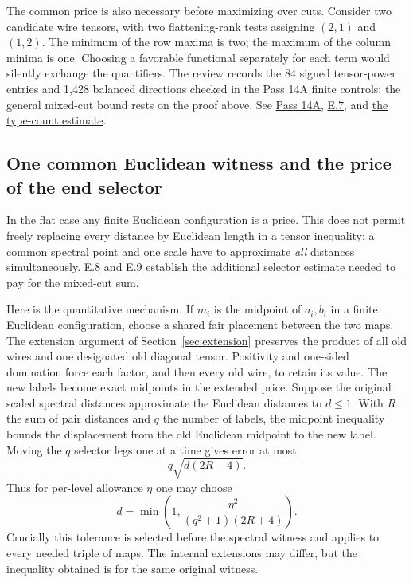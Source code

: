 \documentclass[11pt,letterpaper]{article}
\theoremstyle{definition}\newtheorem{definition}[theorem]{Definition}\newtheorem{example}[theorem]{Example}
\theoremstyle{remark}\newtheorem{remark}[theorem]{Remark}
\newcommand{\pub}[3]{\href{https://github.com/anthropics/formal-math/blob/11b6c7e3c927df2658f513b6b68ea7f8929c62c5/vp-vnp/#1\#L#2}{#3}}
\newcommand{\aud}[2]{\href{https://github.com/nousentllc/VP-VNP-Review/blob/567303d0bcf4f9d54390437b137752446e58ccd6/#1}{#2}}
\begin{document}
The common price is also necessary before maximizing over cuts. Consider two candidate wire tensors, with two flattening-rank tests assigning $(2,1)$ and $(1,2)$. The minimum of the row maxima is two; the maximum of the column minima is one. Choosing a favorable functional separately for each term would silently exchange the quantifiers. The review records the 84 signed tensor-power entries and 1,428 balanced directions checked in the Pass 14A finite controls; the general mixed-cut bound rests on the proof above. See \aud{passes/14a-flat.md}{Pass 14A}, \pub{Paper/Convex.lean}{22}{E.7}, and \pub{Nc/Price/BorderFew.lean}{134}{the type-count estimate}.

\subsection{One common Euclidean witness and the price of the end selector}\label{sec:euclid}
In the flat case any finite Euclidean configuration is a price. This does not permit freely replacing every distance by Euclidean length in a tensor inequality: a common spectral point and one scale have to approximate \emph{all} distances simultaneously. E.8 and E.9 establish the additional selector estimate needed to pay for the mixed-cut sum.

Here is the quantitative mechanism. If $m_i$ is the midpoint of $a_i,b_i$ in a finite Euclidean configuration, choose a shared fair placement between the two maps. The extension argument of Section~\ref{sec:extension} preserves the product of all old wires and one designated old diagonal tensor. Positivity and one-sided domination force each factor, and then every old wire, to retain its value. The new labels become exact midpoints in the extended price. Suppose the original scaled spectral distances approximate the Euclidean distances to $d\le1$. With $R$ the sum of pair distances and $q$ the number of labels, the midpoint inequality bounds the displacement from the old Euclidean midpoint to the new label. Moving the $q$ selector legs one at a time gives error at most
\[
 q\sqrt{d(2R+4)}.
\]
Thus for per-level allowance $\eta$ one may choose
\[
 d=\min\left(1,\frac{\eta^2}{(q^2+1)(2R+4)}\right).
\]
Crucially this tolerance is selected before the spectral witness and applies to every needed triple of maps. The internal extensions may differ, but the inequality obtained is for the same original witness.
\end{document}
